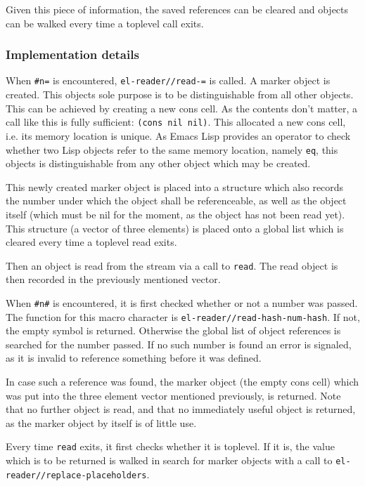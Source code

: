 \documentclass[a4paper,10pt,twoside]{report}
\newcommand{\el}{Emacs Lisp}
\newcommand{\fun}[1]{\texttt{#1}}
\newcommand{\Read}{\fun{read}}
\begin{document}
Given this piece of information, the saved references can be cleared and objects
can be walked every time a toplevel call exits.

\subsubsection{Implementation details}
\label{subsubsec:impl-details}

When \texttt{\#n=} is encountered, \fun{el-reader//read-=} is called.  A marker
object is created.  This objects sole purpose is to be distinguishable from all
other objects.  This can be achieved by creating a new cons cell.  As the
contents don’t matter, a call like this is fully sufficient: \texttt{(cons nil
  nil)}.  This allocated a new cons cell, i.e. its memory location is unique.
As \el{} provides an operator to check whether two Lisp objects refer to the
same memory location, namely \fun{eq}, this objects is distinguishable from any
other object which may be created.

This newly created marker object is placed into a structure which also records
the number under which the object shall be referenceable, as well as the object
itself (which must be nil for the moment, as the object has not been read yet).
This structure (a vector of three elements) is placed onto a global list which
is cleared every time a toplevel read exits.

Then an object is read from the stream via a call to \Read{}.  The read object
is then recorded in the previously mentioned vector.

When \texttt{\#n\#} is encountered, it is first checked whether or not a number
was passed.  The function for this macro character is
\fun{el-reader//read-hash-num-hash}.  If not, the empty symbol is returned.
Otherwise the global list of object references is searched for the number
passed.  If no such number is found an error is signaled, as it is invalid to
reference something before it was defined.

In case such a reference was found, the marker object (the empty cons cell)
which was put into the three element vector mentioned previously, is returned.
Note that no further object is read, and that no immediately useful object is
returned, as the marker object by itself is of little use.

Every time \Read{} exits, it first checks whether it is toplevel.  If it is, the
value which is to be returned is walked in search for marker objects with a call
to \fun{el-reader//replace-placeholders}.
\end{document}
